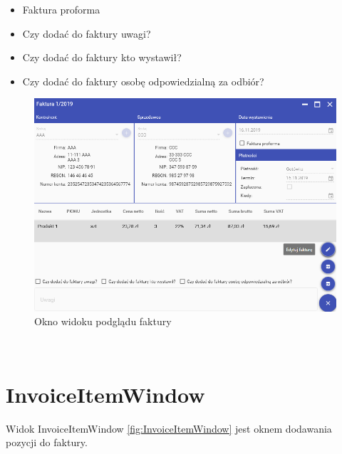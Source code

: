 \begin{itemize}
    \item Faktura proforma
    \item Czy dodać do faktury uwagi?
    \item Czy dodać do faktury kto wystawił?
    \item Czy dodać do faktury osobę odpowiedzialną za odbiór?
\end{itemize}

\begin{figure}[ht!]
\centering
  \includegraphics[width=\linewidth]{Rysunki/Invoice/InvoiceEdit.png}
  \caption{Okno widoku podglądu faktury}
  \label{fig:InvoiceWindowEdit}
\end{figure}

\newpage~\newpage~\newpage~
\section{InvoiceItemWindow}
Widok InvoiceItemWindow \ref{fig:InvoiceItemWindow} jest oknem dodawania pozycji do faktury.

